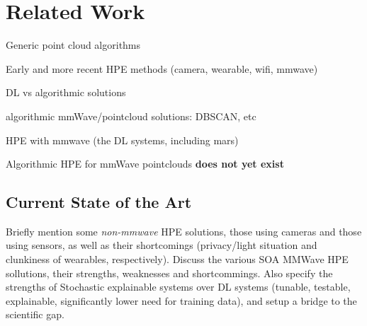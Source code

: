 \section{Related Work}
\label{section: background - related work}





Generic point cloud algorithms

Early and more recent HPE methods (camera, wearable, wifi, mmwave)

DL vs algorithmic solutions

algorithmic mmWave/pointcloud solutions: DBSCAN, etc

HPE with mmwave (the DL systems, including mars)

Algorithmic HPE for mmWave pointclouds \textbf{does not yet exist}

\subsection{Current State of the Art}
\label{sub-section: background - related work - current soa}
Briefly mention some \textit{non-mmwave} HPE solutions, those using cameras and those using sensors, as well as their shortcomings (privacy/light situation and clunkiness of wearables, respectively).
Discuss the various SOA MMWave HPE sollutions, their strengths, weaknesses and shortcommings.
Also specify the strengths of Stochastic explainable systems over DL systems (tunable, testable, explainable, significantly lower need for training data), and setup a bridge to the scientific gap.
